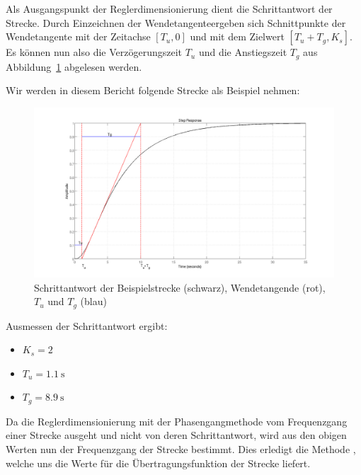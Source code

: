 Als  Ausgangspunkt  der  Reglerdimensionierung dient  die  Schrittantwort  der
Strecke. Durch  Einzeichnen  der  Wendetangente\footnotemark[1]  ergeben  sich
Schnittpunkte  der  Wendetangente mit  der  Zeitachse  $[T_u,0]$ und  mit  dem
Zielwert $[T_u+T_g,K_s]$.   Es k\"onnen nun also  die Verz\"ogerungszeit $T_u$
und  die  Anstiegszeit   $T_g$  aus  Abbildung~\ref{fig:plant_step}  abgelesen
werden.


Wir werden in diesem Bericht folgende Strecke als Beispiel nehmen:
\begin{figure}[h! width=\pagewidth]
    \includegraphics[width=\textwidth]{images/streckeSchrittantwort.png}
    \caption{%
    Schrittantwort der  Beispielstrecke (schwarz), Wendetangende  (rot), $T_u$
    und $T_g$ (blau)
    }
    \label{fig:plant_step}
\end{figure}

Ausmessen der Schrittantwort ergibt:
\begin{itemize}
    \item
        $K_s = 2$\footnotemark[2]
    \item
        $T_u = \SI{1.1}{\second}$
    \item
        $T_g = \SI{8.9}{\second}$
\end{itemize}


Da  die  Reglerdimensionierung  mit  der  Phasengangmethode  vom  Frequenzgang
einer  Strecke  ausgeht und  nicht  von  deren  Schrittantwort, wird  aus  den
obigen Werten  nun der Frequenzgang  der Strecke bestimmt.  Dies  erledigt die
Methode  \footnotemark[3],  welche  uns die  Werte  f\"ur  die
\"Ubertragungsfunktion  der  Strecke liefert.

